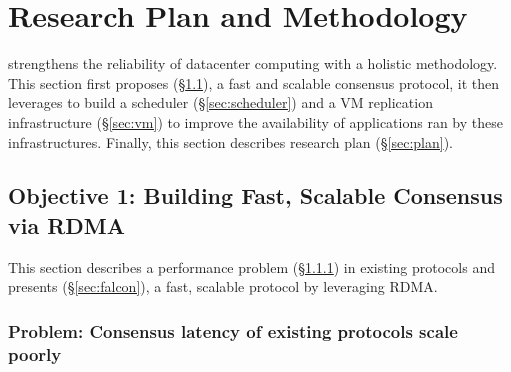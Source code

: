 \vspace{-.15in}\section{Research Plan and Methodology}
\label{sec:rep}\vspace{-.075in}

\xxx strengthens the reliability of datacenter computing with a holistic 
methodology. This section first proposes \falcon (\S\ref{sec:protocol}), a fast 
and scalable consensus protocol, it then leverages \falcon to build a scheduler 
(\S\ref{sec:scheduler}) and a VM replication infrastructure (\S\ref{sec:vm}) to 
improve the availability of applications ran by these infrastructures. 
Finally, this section describes research plan (\S\ref{sec:plan}).

\vspace{-.15in}\subsection{Objective 1: Building Fast, Scalable Consensus via
RDMA}\label{sec:protocol}\vspace{-.075in}

This section describes a performance problem (\S\ref{sec:latency-problem}) in 
existing \paxos protocols and presents \falcon (\S\ref{sec:falcon}), a 
fast, scalable \paxos protocol by leveraging RDMA.

\vspace{-.15in}
\subsubsection{Problem: Consensus latency of existing \paxos 
protocols scale poorly} 
\label{sec:latency-problem}\vspace{-.075in}



